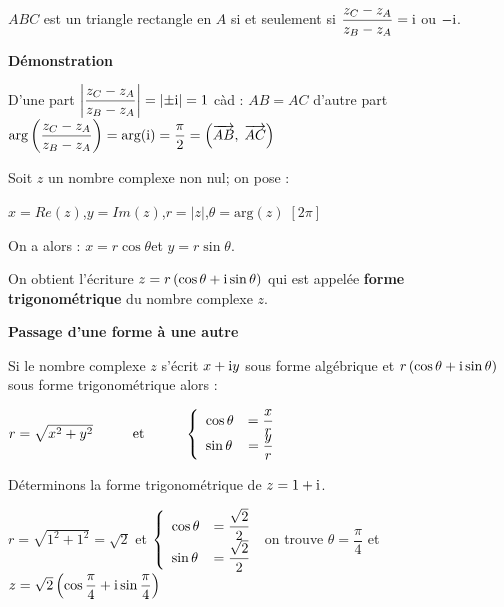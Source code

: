   \medskip
  
   $ ABC $ est un triangle rectangle en $ A $ si et seulement si   $ \dfrac{z_C - z_A}{z_B - z_A} =\text{i} $  ou $ -\text{i} $.
   
   
 \bigskip
 
 \textbf{Démonstration}
 
  \medskip
  
 D'une part  $\left\lvert  \dfrac{z_C - z_A}{z_B - z_A}  \right\rvert=\left\lvert \pm \text{i} \right\rvert =1 $  càd : $ AB=AC $
  \;  d'autre part $ \text{arg}\left(\dfrac{z_C - z_A}{z_B - z_A}\right) = \text{arg}(\text{i})=\dfrac{\pi}{2}=\left( \overrightarrow{AB},\;\overrightarrow{AC} \right) $
  
 
  \begin{definition}
  Soit $ z $ un nombre complexe non nul; on pose :
  \medskip
  
  $ x=Re(z) $,\quad $ y=Im(z) $,\quad $ r=|z| $,\quad $ \theta=\text{arg}(z)\;[2\pi] $
  
  \medskip
  
  On a alors :\;  $ x=r \cos \theta $\quad et \quad $ y= r\sin \theta $.
 
  
  On obtient l'écriture   $ z= r\left(\cos \theta +\text{i} \sin \theta\right)$ qui est appelée \textbf{forme trigonométrique} du nombre complexe $ z $.
   \end{definition}
  \medskip
  
  \textbf{Passage d'une forme à une autre }
  
  
  \medskip
  
  Si le nombre complexe $ z $ s'écrit   $ x+\text{i} y $ sous  forme algébrique  et $ r\left(\cos \theta +\text{i} \sin \theta\right)$   sous forme trigonométrique alors :
  
  
   $ r=\sqrt{x^2+y^2} 
  \hspace*{1cm}  \text{et}  \hspace*{1cm}   \left\{\begin{array}{l c l}
\cos \theta & = \dfrac{x}{r} \\ 	 
\sin \theta & = \dfrac{y}{r}
\end{array}\right. $
 
  
  
  \begin{example}
  
   Déterminons la forme trigonométrique  de $ z=1+\text{i} $.
  
  \medskip
  $ r=\sqrt{1^2+1^2}=\sqrt{2} $  \hspace*{0.5cm}  et  \hspace*{0.5cm} $  \left\{\begin{array}{l c l}
\cos \theta & = \dfrac{\sqrt{2}}{2} \\ 	 
\sin \theta & = \dfrac{\sqrt{2}}{2}
\end{array}\right. $  on trouve $ \theta=\dfrac{\pi}{4} $ \; et\; $ z=\sqrt{2}\left(\cos \dfrac{\pi}{4} +\text{i} \sin \dfrac{\pi}{4}\right)$
\end{example}

